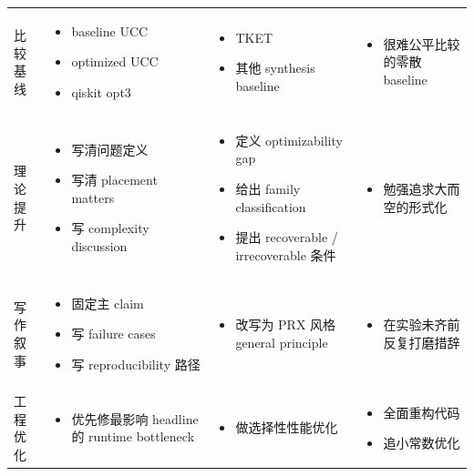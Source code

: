 \documentclass[11pt]{article}
\begin{document}
\begin{longtable}{p{} p{} p{} p{}}
比较基线 &
\begin{itemize}
    \item baseline UCC
    \item optimized UCC
    \item qiskit opt3
\end{itemize}
&
\begin{itemize}
    \item TKET
    \item 其他 synthesis baseline
\end{itemize}
&
\begin{itemize}
    \item 很难公平比较的零散 baseline
\end{itemize}
\\

理论提升 &
\begin{itemize}
    \item 写清问题定义
    \item 写清 placement matters
    \item 写 complexity discussion
\end{itemize}
&
\begin{itemize}
    \item 定义 optimizability gap
    \item 给出 family classification
    \item 提出 recoverable / irrecoverable 条件
\end{itemize}
&
\begin{itemize}
    \item 勉强追求大而空的形式化
\end{itemize}
\\

写作叙事 &
\begin{itemize}
    \item 固定主 claim
    \item 写 failure cases
    \item 写 reproducibility 路径
\end{itemize}
&
\begin{itemize}
    \item 改写为 PRX 风格 general principle
\end{itemize}
&
\begin{itemize}
    \item 在实验未齐前反复打磨措辞
\end{itemize}
\\

工程优化 &
\begin{itemize}
    \item 优先修最影响 headline 的 runtime bottleneck
\end{itemize}
&
\begin{itemize}
    \item 做选择性性能优化
\end{itemize}
&
\begin{itemize}
    \item 全面重构代码
    \item 追小常数优化
\end{itemize}
\\


\end{longtable}
\end{document}
